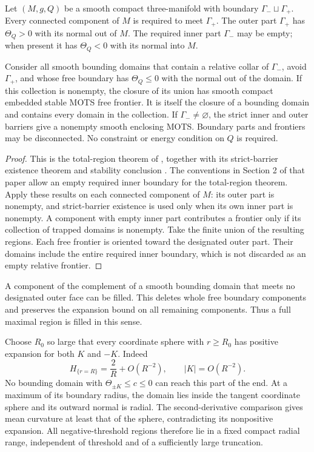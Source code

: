 \begin{lemma}
\label{lem:fl-mots-barriers}
Let \((M,g,Q)\) be a smooth compact three-manifold with boundary
\(\Gamma_-\sqcup\Gamma_+\).  Every connected component of \(M\)
is required to meet \(\Gamma_+\).  The outer part \(\Gamma_+\) has
\(\Theta_Q>0\) with its normal out of \(M\).  The required inner part
\(\Gamma_-\) may be empty; when present it has \(\Theta_Q<0\) with its
normal into \(M\).

Consider all smooth bounding domains that contain a relative collar of
\(\Gamma_-\), avoid \(\Gamma_+\), and whose free boundary has
\(\Theta_Q\le0\) with the normal out of the domain.  If this collection
is nonempty, the closure of its union has smooth compact embedded stable
MOTS free frontier.  It is itself the closure of a bounding domain and
contains every domain in the collection.  If \(\Gamma_-\ne\varnothing\),
the strict inner and outer barriers give a nonempty smooth enclosing
MOTS.  Boundary parts and frontiers may be disconnected.  No constraint
or energy condition on \(Q\) is required.
\end{lemma}

\begin{proof}
This is the total-region theorem of
\cite[Definitions 7.1--7.2 and Theorem 7.3]{anderssonmetzger2009},
together with its strict-barrier existence theorem and stability
conclusion \cite[Theorems 3.1 and 4.1]{anderssonmetzger2009}.
The conventions in Section 2 of that paper allow an empty required
inner boundary for the total-region theorem.  Apply these results on
each connected component of \(M\): its outer part is nonempty, and
strict-barrier existence is used only when its own inner part is
nonempty.  A component with empty inner part contributes a frontier
only if its collection of trapped domains is nonempty.  Take the
finite union of the resulting regions.  Each free frontier is
oriented toward the designated outer part.  Their domains include the
entire required inner boundary, which is not discarded as an empty
relative frontier.
\end{proof}

A component of the complement of a smooth bounding domain that meets
no designated outer face can be filled.  This deletes whole free
boundary components and preserves the expansion bound on all remaining
components.  Thus a full maximal region is filled in this sense.

Choose \(R_0\) so large that every coordinate sphere with \(r\ge R_0\)
has positive expansion for both \(K\) and \(-K\).  Indeed
\[
 H_{\{r=R\}}=\frac2R+O(R^{-2}),\qquad \lvert K\rvert=O(R^{-2}).
\]
No bounding domain with \(\Theta_{\pm K}\le c\le0\) can reach this part
of the end.  At a maximum of its boundary radius, the domain lies inside
the tangent coordinate sphere and its outward normal is radial.
The second-derivative comparison gives mean curvature at least that of
the sphere, contradicting its nonpositive expansion.  All
negative-threshold regions therefore lie in a fixed compact radial
range, independent of threshold and of a sufficiently large truncation.

